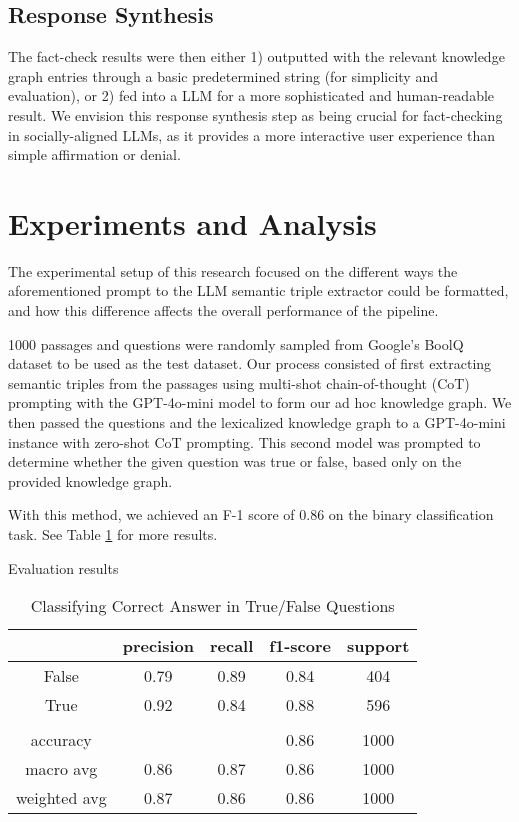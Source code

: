 \documentclass[11pt]{article}
\begin{document}
\subsection{Response Synthesis}
The fact-check results were then either 1) outputted with the relevant knowledge graph entries through a basic predetermined string (for simplicity and evaluation), or 2) fed into a LLM for a more sophisticated and human-readable result. We envision this response synthesis step as being crucial for fact-checking in socially-aligned LLMs, as it provides a more interactive user experience than simple affirmation or denial.

\section{Experiments and Analysis}
The experimental setup of this research focused on the different ways the aforementioned prompt to the LLM semantic triple extractor could be formatted, and how this difference affects the overall performance of the pipeline.

1000 passages and questions were randomly sampled from Google's BoolQ dataset \citep{clark2019boolq} to be used as the test dataset. Our process consisted of first extracting semantic triples from the passages using multi-shot chain-of-thought (CoT) prompting with the GPT-4o-mini model to form our ad hoc knowledge graph. We then passed the questions and the lexicalized knowledge graph to a GPT-4o-mini instance with zero-shot CoT prompting. This second model was prompted to determine whether the given question was true or false, based only on the provided knowledge graph.

With this method, we achieved an F-1 score of 0.86 on the binary classification task. See Table \ref{tab:result} for more results.

\begin{table}[ht]
    \centering
    \caption{Evaluation results}
    
    \caption*{Classifying Correct Answer in True/False Questions}
    \begin{tabular*}{\columnwidth}{c|c|c|c|c}
        \hline
         & precision & recall & f1-score & support \\
        \hline
        False & 0.79 & 0.89 & 0.84 & 404 \\
        True & 0.92 & 0.84 & 0.88 & 596 \\
         &  &  &  & \\
        accuracy &  &  & 0.86 & 1000 \\
        macro avg & 0.86 & 0.87 & 0.86 & 1000 \\
        weighted avg & 0.87 & 0.86 & 0.86 & 1000 \\
        \hline
    \end{tabular*}
    
    \label{tab:result}
\end{table}
\end{document}
